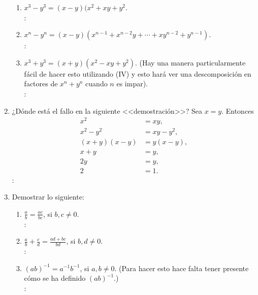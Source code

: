 \begin{enumerate}
\begin{enumerate}[label=\roman*.]
        \item $ x^3 - y^3 = (x-y)(x^2 + xy + y^2  $. \\
        \solucion: \\
        
        \item $ x^n - y^n = (x-y)(x^{n-1} + x^{n-2}y + \cdots + xy^{n-2} + y^{n-1} ) $. \\
        \solucion: \\
        
        \item $ x^3 + y^3 = (x+y)(x^2 - xy + y^2) $. (Hay una manera particularmente fácil de hacer esto utilizando (IV) y esto hará ver una descomposición en factores de $ x^n + y^n $ cuando $ n $ es impar). \\
        \solucion: \\
    \end{enumerate}
    
    \item ¿Dónde está el fallo en la siguiente <<demostración>>? Sea $ x = y $. Entonces
    \begin{align*}
        x^2 & = xy, \\
        x^2 - y^2 & = xy - y^2, \\
        (x+y)(x-y) & = y(x-y), \\
        x + y & = y, \\
        2y & = y, \\
        2 & = 1.
    \end{align*}
    \solucion: \\
    
    \item Demostrar lo siguiente:
    \begin{enumerate}[label=\roman*.]
        \item $ \displaystyle \frac{a}{b} = \frac{ac}{bc} $, si $b,c \neq 0$. \\
        \solucion: \\
        
        \item $ \displaystyle \frac{a}{b} + \frac{c}{d} = \frac{ad + bc}{bd} $, si $b,d \neq 0$. \\
        \solucion: \\
        
        \item $ \displaystyle (ab)^{-1} = a^{-1} b^{-1} $, si $a,b \neq 0$. (Para hacer esto hace falta tener presente cómo se ha definido $(ab)^{-1}$.) \\
        \solucion: \\
        

\end{enumerate}
\end{enumerate}
